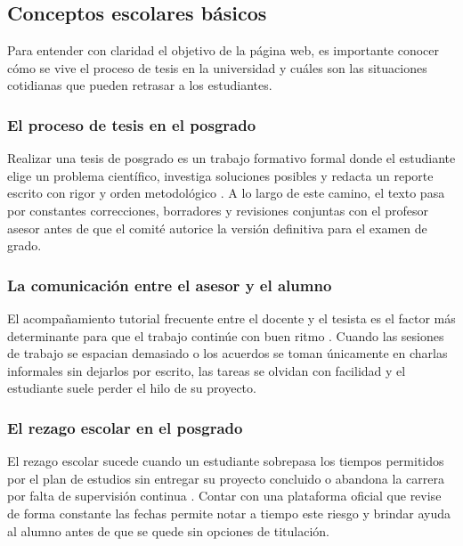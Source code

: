 \subsection{Conceptos escolares básicos}
\label{subsec:conceptos_escolares}

Para entender con claridad el objetivo de la página web, es importante conocer cómo se vive el proceso de tesis en la universidad y cuáles son las situaciones cotidianas que pueden retrasar a los estudiantes.

\subsubsection{El proceso de tesis en el posgrado}
Realizar una tesis de posgrado es un trabajo formativo formal donde el estudiante elige un problema científico, investiga soluciones posibles y redacta un reporte escrito con rigor y orden metodológico \parencite{sampieri2014}. A lo largo de este camino, el texto pasa por constantes correcciones, borradores y revisiones conjuntas con el profesor asesor antes de que el comité autorice la versión definitiva para el examen de grado.

\subsubsection{La comunicación entre el asesor y el alumno}
El acompañamiento tutorial frecuente entre el docente y el tesista es el factor más determinante para que el trabajo continúe con buen ritmo \parencite{sim2023technology}. Cuando las sesiones de trabajo se espacian demasiado o los acuerdos se toman únicamente en charlas informales sin dejarlos por escrito, las tareas se olvidan con facilidad y el estudiante suele perder el hilo de su proyecto.

\subsubsection{El rezago escolar en el posgrado}
El rezago escolar sucede cuando un estudiante sobrepasa los tiempos permitidos por el plan de estudios sin entregar su proyecto concluido o abandona la carrera por falta de supervisión continua \parencite{lando2025digital}. Contar con una plataforma oficial que revise de forma constante las fechas permite notar a tiempo este riesgo y brindar ayuda al alumno antes de que se quede sin opciones de titulación.